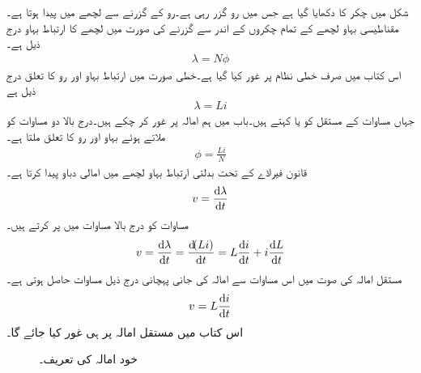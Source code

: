 
شکل  میں  چکر کا  دکھایا گیا ہے جس میں  رو گزر رہی ہے۔رو کے گزرنے سے لچھے میں   پیدا ہوتا ہے۔مقناطیسی بہاو  لچھے کے تمام چکروں کے اندر سے گزرنے کی صورت میں لچھے کا ارتباط بہاو  درج ذیل ہے۔
\begin{align}\label{مساوات_مشترک_ارتباط_بہاو_الف}
\lambda=N \phi
\end{align}
اس کتاب میں صرف خطی نظام پر غور کیا گیا ہے۔خطی صورت میں ارتباط بہاو اور رو کا تعلق درج ذیل ہے
\begin{align}\label{مساوات_مشترک_ارتباط_بہاو_ب}
\lambda=L i
\end{align}
جہاں مساوات کے مستقل  کو  یا  کہتے ہیں۔باب  میں ہم امالہ پر غور کر چکے ہیں۔درج بالا دو مساوات کو ملاتے ہوئے  بہاو اور رو کا تعلق ملتا ہے۔
\begin{align}
\phi=\frac{Li}{N}
\end{align}
قانون فیراڈے کے تحت بدلتی ارتباط بہاو لچھے میں امالی دباو پیدا کرتا ہے۔
\begin{align}
v=\frac{\dif \lambda}{\dif t}
\end{align}
مساوات  کو درج بالا مساوات میں پر کرتے ہیں۔
\begin{align*}
v=\frac{\dif \lambda}{\dif t}=\frac{\dif (Li)}{\dif t}=L\frac{\dif i}{\dif t}+i\frac{\dif L}{\dif t}
\end{align*}
مستقل امالہ کی صوت میں اس مساوات سے امالہ کی جانی پہچانی درج ذیل مساوات حاصل ہوتی ہے۔
\begin{align}
v=L\frac{\dif i}{\dif t}
\end{align}
اس کتاب میں مستقل امالہ پر ہی غور کیا جائے گا۔
%
\begin{figure}
\centering
{}
\caption{خود امالہ کی تعریف۔}
\label{شکل_مقناطیسی_خود_امالہ}
\end{figure}
